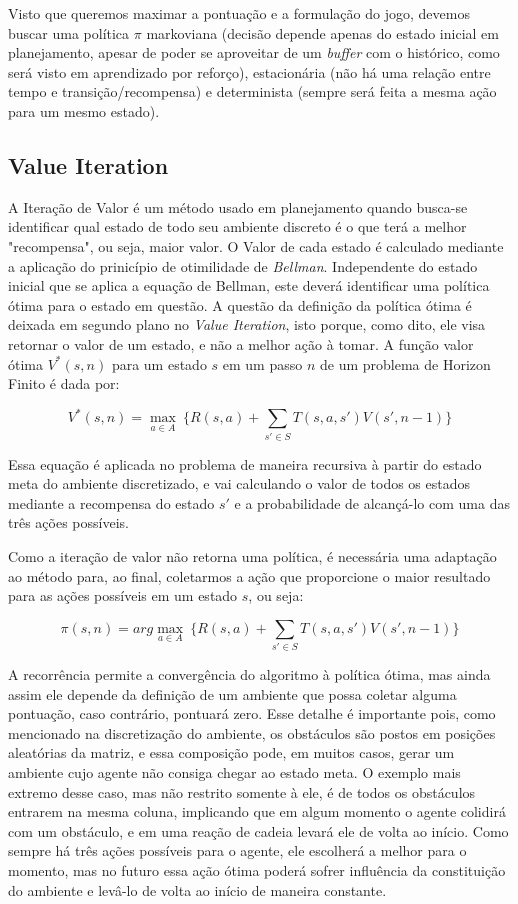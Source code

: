 \documentclass[letterpaper]{article} %
\begin{document}
Visto que queremos maximar a pontuação e a formulação do jogo, devemos buscar uma política $\pi$ markoviana (decisão depende apenas do estado inicial em planejamento, apesar de poder se aproveitar de um \textit{buffer} com o histórico, como será visto em aprendizado por reforço), estacionária (não há uma relação entre tempo e transição/recompensa) e determinista (sempre será feita a mesma ação para um mesmo estado).

\subsection{Value Iteration}
A Iteração de Valor é um método usado em planejamento quando busca-se identificar qual estado de todo seu ambiente discreto é o que terá a melhor "recompensa", ou seja, maior valor. O Valor de cada estado é calculado mediante a aplicação do prinicípio de otimilidade de \textit{Bellman}. Independente do estado inicial que se aplica a equação de Bellman, este deverá identificar uma política ótima para o estado em questão. A questão da definição da política ótima é deixada em segundo plano no \textit{Value Iteration}, isto porque, como dito, ele visa retornar o valor de um estado, e não a melhor ação à tomar. A função valor ótima $V^{*}(s, n)$ para um estado $s$ em um passo $n$ de um problema de Horizon Finito é dada por:

$$
V^{*}(s, n) = \max_{a \in A} \ \{ R(s,a) + \sum_{s' \in S} T(s,a,s')  V(s', n-1)\}
$$

Essa equação é aplicada no problema de maneira recursiva à partir do estado meta do ambiente discretizado, e vai calculando o valor de todos os estados mediante a recompensa do estado $s'$ e a probabilidade de alcançá-lo com uma das três ações possíveis.

Como a iteração de valor não retorna uma política, é necessária uma adaptação ao método para, ao final, coletarmos a ação que proporcione o maior resultado para as ações possíveis em um estado $s$, ou seja:

$$
\pi(s, n) = arg \max_{a \in A} \ \{ R(s,a) + \sum_{s' \in S} T(s,a,s')  V(s', n-1)\}
$$


A recorrência permite a convergência do algoritmo à política ótima, mas ainda assim ele depende da definição de um ambiente que possa coletar alguma pontuação, caso contrário, pontuará zero. Esse detalhe é importante pois, como mencionado na discretização do ambiente, os obstáculos são postos em posições aleatórias da matriz, e essa composição pode, em muitos casos, gerar um ambiente cujo agente não consiga chegar ao estado meta. O exemplo mais extremo desse caso, mas não restrito somente à ele, é de todos os obstáculos entrarem na mesma coluna, implicando que em algum momento o agente colidirá com um obstáculo, e em uma reação de cadeia levará ele de volta ao início. Como sempre há três ações possíveis para o agente, ele escolherá a melhor para o momento, mas no futuro essa ação ótima poderá sofrer influência da constituição do ambiente e levâ-lo de volta ao início de maneira constante. 
\end{document}
